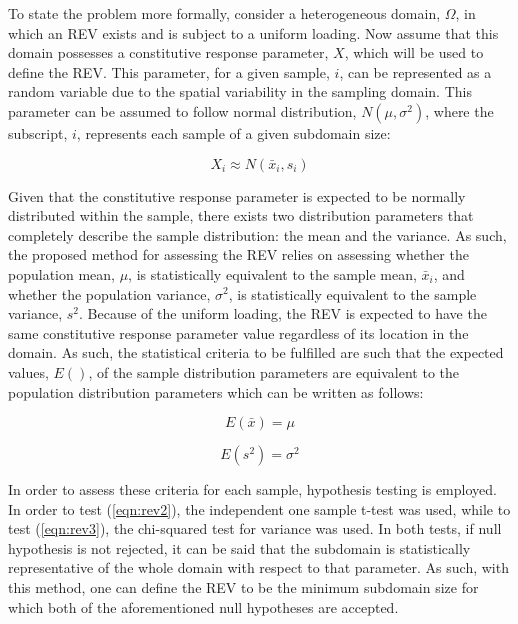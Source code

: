 To state the problem more formally, consider a heterogeneous domain, $\Omega$, in which an REV exists and is subject to a uniform loading. Now assume that this domain possesses a constitutive response parameter, $X$, which will be used to define the REV. This parameter, for a given sample, $i$, can be represented as a random variable due to the spatial variability in the sampling domain. This parameter can be assumed to follow normal distribution, $N\left(\mu,\sigma^2 \right)$, where the subscript, $i$, represents each sample of a given subdomain size:

\begin{equation}
X_i \approx N\left(\bar{x}_i,s_i \right)
\label{eqn:rev1}
\end{equation}

Given that the constitutive response parameter is expected to be normally distributed within the sample, there exists two distribution parameters that completely describe the sample distribution: the mean and the variance. As such, the proposed method for assessing the REV relies on assessing whether the population mean, $\mu$, is statistically equivalent to the sample mean, $\bar{x}_i$, and whether the population variance, $\sigma^2$, is statistically equivalent to the sample variance, $s^2$. Because of the uniform loading, the REV is expected to have the same constitutive response parameter value regardless of its location in the domain. As such, the statistical criteria to be fulfilled are such that the expected values, $E()$, of the sample distribution parameters are equivalent to the population distribution parameters which can be written as follows:

\begin{equation}
E\left(\bar{x}\right) = \mu
\label{eqn:rev2}
\end{equation}


\begin{equation}
E\left(s^2\right) = \sigma^2
\label{eqn:rev3}
\end{equation}

In order to assess these criteria for each sample, hypothesis testing is employed. In order to test (\ref{eqn:rev2}), the independent one sample t-test was used, while to test (\ref{eqn:rev3}), the chi-squared test for variance was used. In both tests, if null hypothesis is not rejected, it can be said that the subdomain is statistically representative of the whole domain with respect to that parameter. As such, with this method, one can define the REV to be the minimum subdomain size for which both of the aforementioned null hypotheses are accepted.

